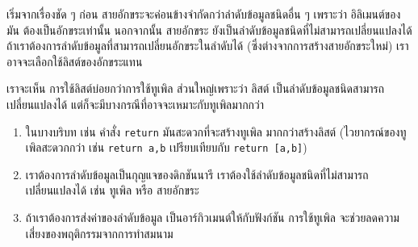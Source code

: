 
เริ่มจากเรื่องชัด ๆ ก่อน
สายอักขระจะค่อนข้างจำกัดกว่าลำดับข้อมูลชนิดอื่น ๆ
เพราะว่า อิลิเมนต์ของมัน ต้องเป็นอักขระเท่านั้น
นอกจากนั้น สายอักขระ ยังเป็นลำดับข้อมูลชนิดที่ไม่สามารถเปลี่ยนแปลงได้
ถ้าเราต้องการลำดับข้อมูลที่สามารถเปลี่ยนอักขระในลำดับได้ 
(ซึ่งต่างจากการสร้างสายอักขระใหม่)
เราอาจจะเลือกใช้ลิสต์ของอักขระแทน



เราจะเห็น การใช้ลิสต์บ่อยกว่าการใช้ทูเพิล
ส่วนใหญ่เพราะว่า ลิสต์ เป็นลำดับข้อมูลชนิดสามารถเปลี่ยนแปลงได้
แต่ก็จะมีบางกรณีที่อาจจะเหมาะกับทูเพิลมากกว่า

\begin{enumerate}


\item ในบางบริบท เช่น คำสั่ง \texttt{return} 
มันสะดวกที่จะสร้างทูเพิล มากกว่าสร้างลิสต์
(ไวยากรณ์ของทูเพิลสะดวกกว่า 
เช่น \texttt{return a,b} เปรียบเทียบกับ \texttt{return [a,b]})


\item เราต้องการลำดับข้อมูลเป็นกุญแจของดิกชันนารี
เราต้องใช้ลำดับข้อมูลชนิดที่ไม่สามารถเปลี่ยนแปลงได้ เช่น ทูเพิล หรือ สายอักขระ


\item ถ้าเราต้องการส่งค่าของลำดับข้อมูล เป็นอาร์กิวเมนต์ให้กับฟังก์ชัน
การใช้ทูเพิล จะช่วยลดความเสี่ยงของพฤติกรรมจากการทำสมนาม

\end{enumerate}


